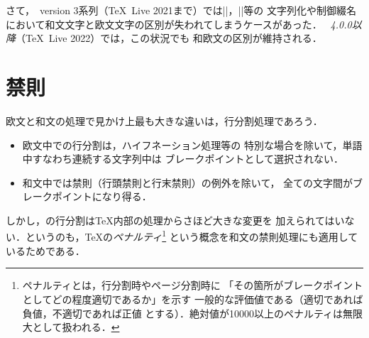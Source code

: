 \documentclass[a4paper,11pt,nomag,dvipdfmx]{jsarticle}
\def\code#1{\texttt{#1}}
\begin{document}
さて，\pTeX~version 3系列（\TeX~Live 2021まで）では|\meaning|，|\string|等の
文字列化や制御綴名において和文文字と欧文文字の区別が失われてしまうケースがあった．
\emph{\pTeX~4.0.0以降}（\TeX~Live 2022）では，この状況でも
和欧文の区別が維持される\cite{tjb81}．

\section{禁則}
\label{sec:kinsoku}

欧文と和文の処理で見かけ上最も大きな違いは，行分割処理であろう．
\begin{itemize}
\item 欧文中での行分割は，ハイフネーション処理等の
      特別な場合を除いて，単語中すなわち連続する文字列中は
      ブレークポイントとして選択されない．
\item 和文中では禁則（行頭禁則と行末禁則）の例外を除いて，
      全ての文字間がブレークポイントになり得る．
\end{itemize}
しかし，\pTeX の行分割は\TeX 内部の処理からさほど大きな変更を
加えられてはいない．というのも，\TeX の\emph{ペナルティ}\footnote{%
ペナルティとは，行分割時やページ分割時に
「その箇所がブレークポイントとしてどの程度適切であるか」を示す
一般的な評価値である（適切であれば負値，不適切であれば正値
とする）．絶対値が10000以上のペナルティは無限大として扱われる．}%
という概念を和文の禁則処理にも適用しているためである．
\end{document}
